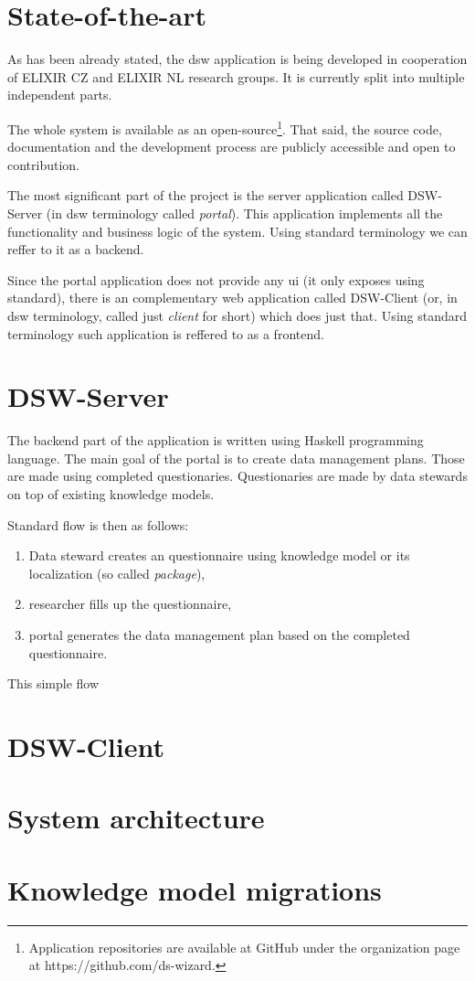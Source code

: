 \section{State-of-the-art}

As has been already stated, the \gls{dsw} application is being developed in cooperation of ELIXIR CZ and ELIXIR NL research groups.
It is currently split into multiple independent parts.

The whole system is available as an open-source\footnote{Application repositories are available at GitHub under the organization page at https://github.com/ds-wizard.}.
That said, the source code, documentation and the development process are publicly accessible and open to contribution.

The most significant part of the project is the server application called DSW-Server (in \gls{dsw} terminology called \textit{portal}).
This application implements all the functionality and business logic of the system.
Using standard terminology we can reffer to it as a backend.

Since the portal application does not provide any \gls{ui} (it only exposes  using  standard), there is an complementary web application called DSW-Client (or, in \gls{dsw} terminology, called just \textit{client} for short) which does just that.
Using standard terminology such application is reffered to as a frontend.


\section{DSW-Server}

The backend part of the application is written using Haskell programming language.
The main goal of the portal is to create data management plans.
Those are made using completed questionaries.
Questionaries are made by data stewards on top of existing knowledge models.


Standard flow is then as follows:

\begin{enumerate}
    \item Data steward creates an questionnaire using knowledge model or its localization (so called \textit{package}),
    \item researcher fills up the questionnaire,
    \item portal generates the data management plan based on the completed questionnaire.
\end{enumerate}

This simple flow

\section{DSW-Client}

\section{System architecture}

\section{Knowledge model migrations}
